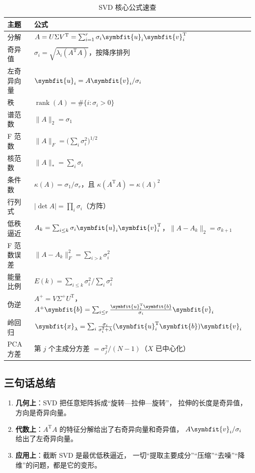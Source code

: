 \documentclass[UTF8, 11pt, a4paper, fontset=windows]{ctexart}
\theoremstyle{cnthm}
\theoremstyle{cndef}
\newcommand{\T}{^{\mathrm{T}}}
\newcommand{\nrm}[1]{\lVert #1 \rVert}
\newcommand{\abs}[1]{\lvert #1 \rvert}
\DeclareMathOperator{\rank}{rank}
\newcommand{\bu}{\symbfit{u}}
\newcommand{\x}{\symbfit{x}}
\newcommand{\bb}{\symbfit{b}}
\newcommand{\vv}{\symbfit{v}}
\begin{document}
\begin{table}[H]
\centering
\small
\caption{SVD 核心公式速查}\label{tab:cheatsheet}
\renewcommand{\arraystretch}{1.32}
\begin{tabular}{@{}p{4.2cm}p{10.2cm}@{}}
\toprule
\textbf{主题} & \textbf{公式} \\
\midrule
分解 & $A=U\Sigma V\T=\sum_{i=1}^{r}\sigma_i\bu_i\vv_i\T$ \\
奇异值 & $\sigma_i=\sqrt{\lambda_i(A\T A)}$，按降序排列 \\
左奇异向量 & $\bu_i=A\vv_i/\sigma_i$ \\
秩 & $\rank(A)=\#\{i:\sigma_i>0\}$ \\
谱范数 & $\nrm{A}_2=\sigma_1$ \\
F 范数 & $\nrm{A}_F=\big(\sum_i\sigma_i^2\big)^{1/2}$ \\
核范数 & $\nrm{A}_*=\sum_i\sigma_i$ \\
条件数 & $\kappa(A)=\sigma_1/\sigma_r$，且 $\kappa(A\T A)=\kappa(A)^2$ \\
行列式 & $\abs{\det A}=\prod_i\sigma_i$（方阵） \\
低秩逼近 & $A_k=\sum_{i\le k}\sigma_i\bu_i\vv_i\T$，$\nrm{A-A_k}_2=\sigma_{k+1}$ \\
F 范数误差 & $\nrm{A-A_k}_F^2=\sum_{i>k}\sigma_i^2$ \\
能量比例 & $E(k)=\sum_{i\le k}\sigma_i^2\big/\sum_i\sigma_i^2$ \\
伪逆 & $A^{+}=V\Sigma^{+}U\T$，$A^{+}\bb=\sum_{i\le r}\frac{\bu_i\T\bb}{\sigma_i}\vv_i$ \\
岭回归 & $\x_\lambda=\sum_{i}\frac{\sigma_i}{\sigma_i^2+\lambda}(\bu_i\T\bb)\vv_i$ \\
PCA 方差 & 第 $j$ 个主成分方差 $=\sigma_j^2/(N-1)$（$X$ 已中心化） \\
\bottomrule
\end{tabular}
\end{table}

\subsection{三句话总结}

\begin{keybox}[如果只记三句话]
\begin{enumerate}[leftmargin=1.4em, itemsep=3pt]
  \item \textbf{几何上}：SVD 把任意矩阵拆成“旋转—拉伸—旋转”，
        拉伸的长度是奇异值，方向是奇异向量。
  \item \textbf{代数上}：$A\T A$ 的特征分解给出了右奇异向量和奇异值，
        $A\vv_i/\sigma_i$ 给出了左奇异向量。
  \item \textbf{应用上}：截断 SVD 是最优低秩逼近，
        一切“提取主要成分”“压缩”“去噪”“降维”的问题，都是它的变形。
\end{enumerate}
\end{keybox}
\end{document}
